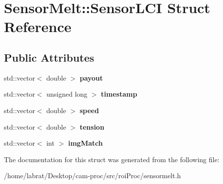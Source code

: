 \hypertarget{structSensorMelt_1_1SensorLCI}{}\section{Sensor\+Melt\+:\+:Sensor\+L\+CI Struct Reference}
\label{structSensorMelt_1_1SensorLCI}
\subsection*{Public Attributes}
\begin{DoxyCompactItemize}
\item 
std\+::vector$<$ double $>$ {\bfseries payout}\hypertarget{structSensorMelt_1_1SensorLCI_afafa8f4607bf094fc03a4c05c503107f}{}\label{structSensorMelt_1_1SensorLCI_afafa8f4607bf094fc03a4c05c503107f}

\item 
std\+::vector$<$ unsigned long $>$ {\bfseries timestamp}\hypertarget{structSensorMelt_1_1SensorLCI_a72408f7b354ba8bdd1a7cdc9db168e6a}{}\label{structSensorMelt_1_1SensorLCI_a72408f7b354ba8bdd1a7cdc9db168e6a}

\item 
std\+::vector$<$ double $>$ {\bfseries speed}\hypertarget{structSensorMelt_1_1SensorLCI_abd61ded924748dba10130c0359cebbdf}{}\label{structSensorMelt_1_1SensorLCI_abd61ded924748dba10130c0359cebbdf}

\item 
std\+::vector$<$ double $>$ {\bfseries tension}\hypertarget{structSensorMelt_1_1SensorLCI_a6b6f4e8d9d1bad5aa6b96e38de4e3981}{}\label{structSensorMelt_1_1SensorLCI_a6b6f4e8d9d1bad5aa6b96e38de4e3981}

\item 
std\+::vector$<$ int $>$ {\bfseries img\+Match}\hypertarget{structSensorMelt_1_1SensorLCI_a475902407ee8e80c1a62f7d92fa548d2}{}\label{structSensorMelt_1_1SensorLCI_a475902407ee8e80c1a62f7d92fa548d2}

\end{DoxyCompactItemize}


The documentation for this struct was generated from the following file\+:\begin{DoxyCompactItemize}
\item 
/home/labrat/\+Desktop/cam-\/proc/src/roi\+Proc/sensormelt.\+h\end{DoxyCompactItemize}
